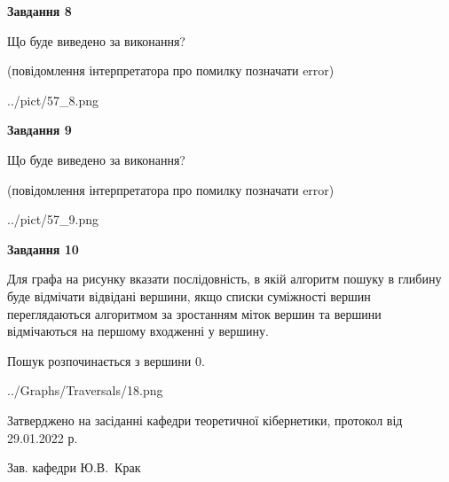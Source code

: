 \documentclass[12pt, ukrainian]{article}
\begin{document}
{\begin {large}
{\begin {center}\textbf{Завдання 8}\end {center}}\par
Що буде виведено за виконання?\par
 (повідомлення інтерпретатора про помилку позначати error)\par
\begin{center}
	{../pict/57_8.png}
\end{center}
\newpage

{\begin {center}\textbf{Завдання 9}\end {center}}\par
Що буде виведено за виконання?\par
 (повідомлення інтерпретатора про помилку позначати error)\par
\begin{center}
	{../pict/57_9.png}
\end{center}
\newpage

{\begin {center}\textbf{Завдання 10}\end {center}}\par
Для графа на рисунку вказати послідовність, в якій алгоритм пошуку в глибину буде відмічати відвідані вершини, якщо списки суміжності вершин переглядаються алгоритмом за зростанням міток вершин та вершини відмічаються на першому вход\-женні у вершину.\par
Пошук розпочинається з вершини 0.\par

\begin{center}
	{../Graphs/Traversals/18.png}
\end{center}\par
\newpage


\end {large}
}
{\smallskip \begin {small} Затверджено на засіданні кафедри теоретичної кібернетики, протокол  від   29.01.2022 р.\par\smallskip\smallskip
{\parbox {6.5 cm}{Зав. кафедри \dotfill Ю.В.~Крак}} \end{small}}
\end{document}
